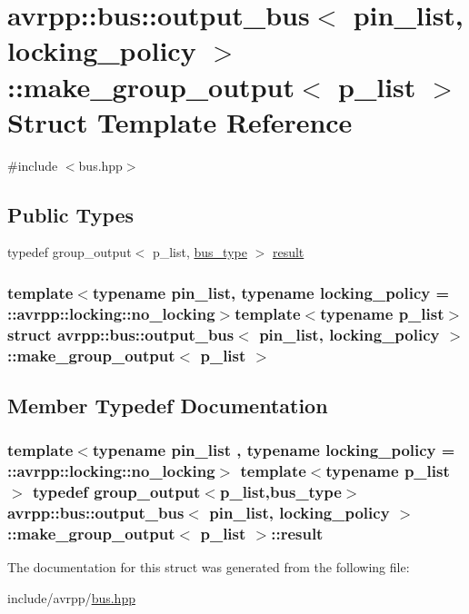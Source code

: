 \hypertarget{structavrpp_1_1bus_1_1output__bus_1_1make__group__output}{
\section{avrpp::bus::output\_\-bus$<$ pin\_\-list, locking\_\-policy $>$::make\_\-group\_\-output$<$ p\_\-list $>$ Struct Template Reference}
\label{structavrpp_1_1bus_1_1output__bus_1_1make__group__output}
}


{\ttfamily \#include $<$bus.hpp$>$}

\subsection*{Public Types}
\begin{DoxyCompactItemize}
\item 
typedef group\_\-output$<$ p\_\-list, \hyperlink{structavrpp_1_1bus_1_1output__bus_a02bf22de8447c8097a3c77e0f896a3b4}{bus\_\-type} $>$ \hyperlink{structavrpp_1_1bus_1_1output__bus_1_1make__group__output_a14b19fc61facda7a087b053f80d62aa4}{result}
\end{DoxyCompactItemize}
\subsubsection*{template$<$typename pin\_\-list, typename locking\_\-policy = ::avrpp::locking::no\_\-locking$>$template$<$typename p\_\-list$>$ struct avrpp::bus::output\_\-bus$<$ pin\_\-list, locking\_\-policy $>$::make\_\-group\_\-output$<$ p\_\-list $>$}



\subsection{Member Typedef Documentation}
\hypertarget{structavrpp_1_1bus_1_1output__bus_1_1make__group__output_a14b19fc61facda7a087b053f80d62aa4}{
\subsubsection[{result}]{\setlength{\rightskip}{0pt plus 5cm}template$<$typename pin\_\-list , typename locking\_\-policy  = ::avrpp::locking::no\_\-locking$>$ template$<$typename p\_\-list $>$ typedef group\_\-output$<$p\_\-list,{\bf bus\_\-type}$>$ {\bf avrpp::bus::output\_\-bus}$<$ pin\_\-list, locking\_\-policy $>$::{\bf make\_\-group\_\-output}$<$ p\_\-list $>$::{\bf result}}}
\label{structavrpp_1_1bus_1_1output__bus_1_1make__group__output_a14b19fc61facda7a087b053f80d62aa4}


The documentation for this struct was generated from the following file:\begin{DoxyCompactItemize}
\item 
include/avrpp/\hyperlink{bus_8hpp}{bus.hpp}\end{DoxyCompactItemize}

